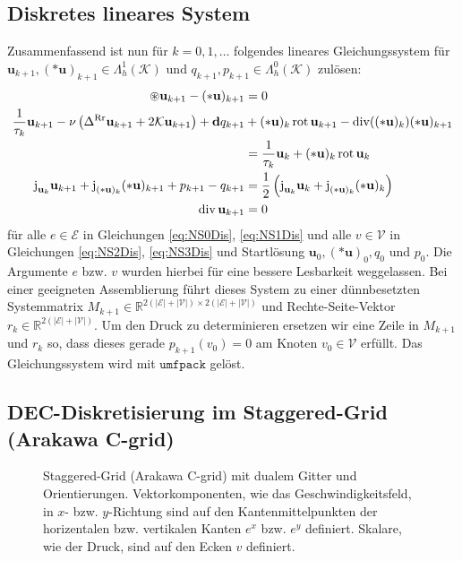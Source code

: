 \documentclass[a4paper,11pt]{scrartcl}
\newcommand{\U}{u} %
\newcommand{\Ub}{\mathbf{\U}} %
\renewcommand{\P}{p} %
\newcommand{\gauss}{\mathcal{K}} %
\newcommand{\R}{\mathbb{R}}
\renewcommand{\div}{\operatorname{div}} %
\newcommand{\rot}{\operatorname{rot}} %
\newcommand{\exd}{\mathbf{d}} %
\newcommand{\lrr}{\Delta^{\textup{Rr}}} %
\newcommand{\jup}{\textup{j}} %
\newcommand{\SC}{\mathcal{K}} %
\newcommand{\Vs}{\mathcal{V}} %
\newcommand{\Es}{\mathcal{E}} %
\begin{document}
\subsection{Diskretes lineares System}
  Zusammenfassend ist nun für \( k=0,1,\ldots \) folgendes lineares Gleichungssystem 
  für \\\( \Ub_{k+1}, (*\Ub)_{k+1} \in \Lambda^{1}_{h}(\SC)\) und \( q_{k+1} , p_{k+1} \in \Lambda^{0}_{h}(\SC) \) zulösen:
  \begin{align}
    \circledast\Ub_{k+1} - (*\Ub)_{k+1} &= 0 \label{eq:NS0Dis}\\
    \frac{1}{\tau_{k}}\Ub_{k+1} - \nu\left( \lrr\Ub_{k+1} + 2\gauss\Ub_{k+1} \right) + \exd q_{k+1}
        &+ (*\Ub)_{k}\rot\Ub_{k+1} - \div((*\Ub)_{k})(*\Ub)_{k+1} \notag\\
              &= \frac{1}{\tau_{k}}\Ub_{k} + (*\Ub)_{k}\rot\Ub_{k} \label{eq:NS1Dis}\\
     \jup_{\Ub_{k}}\Ub_{k+1} + \jup_{(*\Ub)_{k}}(*\Ub)_{k+1} + \P_{k+1} - q_{k+1} 
          &= \frac{1}{2}\left( \jup_{\Ub_{k}}\Ub_{k} + \jup_{(*\Ub)_{k}}(*\Ub)_{k} \right) \label{eq:NS2Dis}\\
    \div\Ub_{k+1} &= 0 \label{eq:NS3Dis}
  \end{align}
  für alle \( e\in\Es \) in Gleichungen \eqref{eq:NS0Dis}, \eqref{eq:NS1Dis}  und alle \( v\in\Vs \) in Gleichungen \eqref{eq:NS2Dis}, \eqref{eq:NS3Dis}
  und Startlösung \(  \Ub_{0}, (*\Ub)_{0}, q_{0}\) und \( p_{0}\).
  Die Argumente \( e \) bzw. \( v \) wurden hierbei für eine bessere Lesbarkeit weggelassen.
  Bei einer geeigneten Assemblierung führt dieses System zu einer dünnbesetzten Systemmatrix 
  \( M_{k+1}\in\R^{2(|\Es| + |\Vs|)\times 2(|\Es| + |\Vs|)} \) und Rechte-Seite-Vektor 
  \( r_{k}\in\R^{2(|\Es| + |\Vs|)} \).
  Um den Druck zu determinieren ersetzen wir eine Zeile in \( M_{k+1} \) und \( r_{k} \) so, 
  dass dieses gerade \( p_{k+1}(v_{0}) = 0 \) am Knoten \( v_{0}\in\Vs \) erfüllt.
  Das Gleichungssystem wird mit \( \texttt{umfpack} \) gelöst.

\subsection{DEC-Diskretisierung im Staggered-Grid (Arakawa C-grid)}
  
    \begin{figure}[tbp]
      \centering
      
      \caption{Staggered-Grid (Arakawa C-grid) mit dualem Gitter und Orientierungen.
               Vektorkomponenten, wie das Geschwindigkeitsfeld, in \( x \)- bzw. \( y \)-Richtung sind auf den Kantenmittelpunkten 
               der horizentalen bzw. vertikalen Kanten \( e^{x} \) bzw. \( e^{y} \) definiert. 
               Skalare, wie der Druck, sind auf den Ecken \( v \) definiert.}
      \label{fig:staggeredGrid}
    \end{figure}
\end{document}
